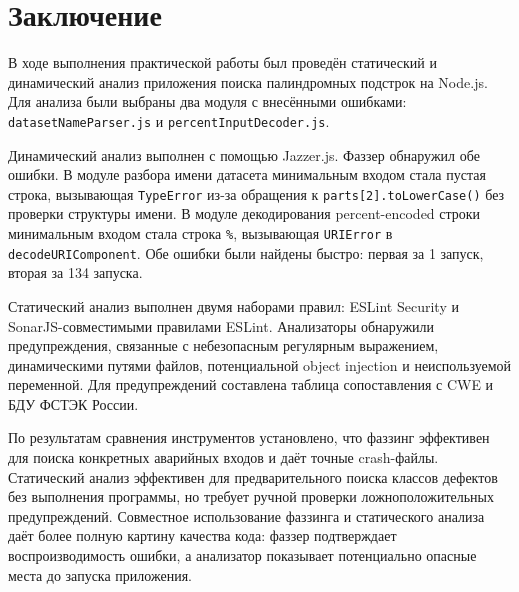 \chapter*{Заключение} \label{ch-conclusion}

В ходе выполнения практической работы был проведён статический и динамический
анализ приложения поиска палиндромных подстрок на Node.js. Для анализа были
выбраны два модуля с внесёнными ошибками: \texttt{datasetNameParser.js} и
\texttt{percentInputDecoder.js}.

Динамический анализ выполнен с помощью Jazzer.js. Фаззер обнаружил обе ошибки.
В модуле разбора имени датасета минимальным входом стала пустая строка, вызывающая
\texttt{TypeError} из-за обращения к \texttt{parts[2].toLowerCase()} без проверки
структуры имени. В модуле декодирования percent-encoded строки минимальным входом
стала строка \texttt{\%}, вызывающая \texttt{URIError} в \texttt{decodeURIComponent}.
Обе ошибки были найдены быстро: первая за 1 запуск, вторая за 134 запуска.

Статический анализ выполнен двумя наборами правил: ESLint Security и
SonarJS-совместимыми правилами ESLint. Анализаторы обнаружили предупреждения,
связанные с небезопасным регулярным выражением, динамическими путями файлов,
потенциальной object injection и неиспользуемой переменной. Для предупреждений
составлена таблица сопоставления с CWE и БДУ ФСТЭК России.

По результатам сравнения инструментов установлено, что фаззинг эффективен для
поиска конкретных аварийных входов и даёт точные crash-файлы. Статический анализ
эффективен для предварительного поиска классов дефектов без выполнения программы,
но требует ручной проверки ложноположительных предупреждений. Совместное
использование фаззинга и статического анализа даёт более полную картину качества
кода: фаззер подтверждает воспроизводимость ошибки, а анализатор показывает
потенциально опасные места до запуска приложения.
